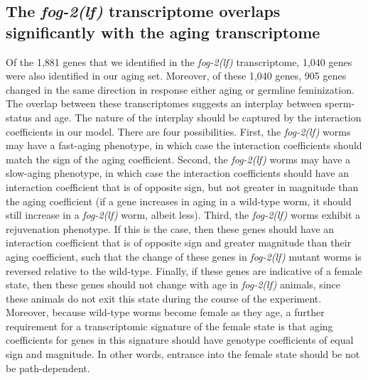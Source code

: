 \documentclass[10pt,letterpaper,twocolumn]{article}
\newcommand{\fog}{\emph{\mbox{fog-2(lf)}}}
\newcommand{\fogn}{1,881}
\newcommand{\coexpressed}{905}
\newcommand{\intersectn}{1,040}
\begin{document}
\subsection*{The \fog{} transcriptome overlaps significantly with the aging
transcriptome}
Of the \fogn{} genes that we identified in the \fog{}
transcriptome, \intersectn{} genes were also identified in our aging set.
Moreover, of these \intersectn{}  genes, \coexpressed{} genes changed in the
same direction in response either aging or germline feminization.
The overlap between these transcriptomes suggests an interplay between sperm-status
and age. The nature of the interplay should be captured by the interaction coefficients
in our model.
There are four possibilities. First, the \fog{} worms may
have a fast-aging phenotype, in which case the interaction coefficients should
match the sign of the aging coefficient.
Second, the \fog{} worms may
have a slow-aging phenotype, in which case the interaction coefficients should
have an interaction coefficient that is of opposite sign, but not greater in
magnitude than the aging coefficient (if a gene increases in aging in a
wild-type worm, it should still increase in a \fog{} worm, albeit less).
Third, the \fog{} worms exhibit a rejuvenation phenotype. If this is the case,
then these genes should have an interaction coefficient that is of opposite sign
and greater magnitude than their aging coefficient, such that the change of
these genes in \fog{} mutant worms is reversed relative to the wild-type.
Finally, if these genes are indicative of a female state, then these genes
should not change with age in \fog{} animals, since these animals do not exit
this state during the course of the experiment.
Moreover, because wild-type
worms become female as they age, a further requirement for a transcriptomic
signature of the female state is that aging coefficients for genes in this
signature should have genotype coefficients of equal sign and magnitude. In
other words, entrance into the female state should be not be path-dependent.
\end{document}
